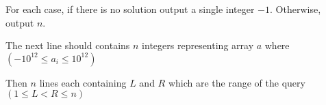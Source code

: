 For each case, if there is no solution output a single integer $-1$. Otherwise, output $n$.

The next line should contains $n$ integers representing array $a$ where $(-10^{12} \leq a_i \le 10^{12})$

Then $n$ lines each containing $L$ and $R$ which are the range of the query $(1 \le L < R \le n)$